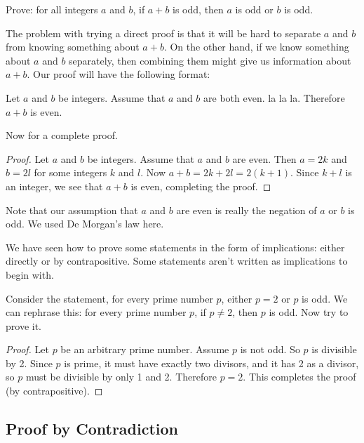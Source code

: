 \documentclass[12pt]{article}
\begin{document}
 
  \begin{example} 
   Prove: for all integers $a$ and $b$, if $a + b$ is odd, then $a$ is odd or $b$ is odd.  
   \begin{solution}
     The problem with trying a direct proof is that it will be hard to separate $a$ and $b$ from knowing something about $a+b$.  On the other hand, if we know something about $a$ and $b$ separately, then combining them might give us information about $a+b$.  Our proof will have the following format:
     
     Let $a$ and $b$ be integers.  Assume that $a$ and $b$ are both even.  la la la.  Therefore $a+b$ is even.
     
     Now for a complete proof.
     \begin{proof}
       Let $a$ and $b$ be integers.  Assume that $a$ and $b$ are even.  Then $a = 2k$ and $b = 2l$ for some integers $k$ and $l$.  Now $a + b = 2k + 2l = 2(k+1)$.  Since $k + l$ is an integer, we see that $a + b$ is even, completing the proof.
     \end{proof}
     
     Note that our assumption that $a$ and $b$ are even is really the negation of $a$ or $b$ is odd.  We used De Morgan's law here.
   \end{solution}
 \end{example}
 
 
We have seen how to prove some statements in the form of implications: either directly or by contrapositive.  Some statements aren't written as implications to begin with.
   
  \begin{example}
    Consider the statement, for every prime number $p$, either $p = 2$ or $p$ is odd.  We can rephrase this: for every prime number $p$, if $p \ne 2$, then $p$ is odd.  Now try to prove it.
    
    \begin{proof}
     Let $p$ be an arbitrary prime number.  Assume $p$ is not odd.  So $p$ is divisible by 2.  Since $p$ is prime, it must have exactly two divisors, and it has 2 as a divisor, so $p$ must be divisible by only 1 and 2.  Therefore $p = 2$.  This completes the proof (by contrapositive). 
    \end{proof}
 
  \end{example} 
 
 
 
 
\subsection*{Proof by Contradiction}  
\end{document}
